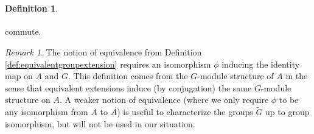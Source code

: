 \documentclass{dcthesis}
\newcommand{\defi}[1]{\textsf{#1}}
\newcommand{\wt}[1]{\widetilde{#1}}
\numberwithin{equation}{section}
\theoremstyle{definition}
\newtheorem{definition}[equation]{Definition}
\theoremstyle{remark}
\newtheorem{remark}[equation]{Remark}
\begin{document}
{{{\begin{definition}
\begin{equation}
\begin{tikzcd}
        \end{tikzcd}
      \end{equation}
      commute.
    \end{definition}
    \begin{remark}
      \label{rmk:otherequivalences}
      The notion of equivalence from
      Definition \ref{def:equivalentgroupextension}
      requires an isomorphism $\phi$
      inducing the identity map on $A$ and $G$.
      This definition comes from the
      $G$-module structure of $A$
      in the sense that equivalent extensions
      induce (by conjugation) the same
      $G$-module structure on $A$.
      A weaker notion of equivalence
      (where we only require $\phi$
      to be any isomorphism from $A$ to $A$)
      is useful to characterize
      the groups $\wt{G}$ up to group isomorphism,
      but will not be used in our situation.
    \end{remark}
}}}
\end{document}
